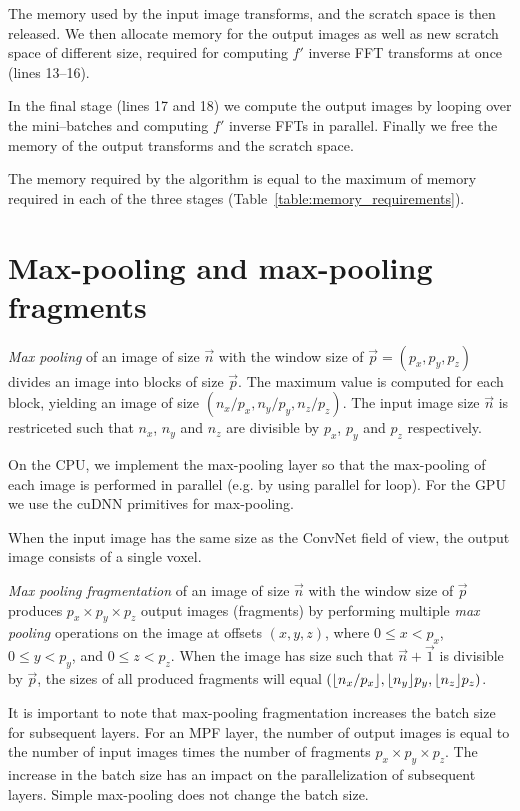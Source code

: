 \documentclass[conference]{./IEEEtran/IEEEtran}
\DeclarePairedDelimiter{\floor}{\lfloor}{\rfloor}
\begin{document}
  The memory used by the input image transforms, and the scratch space
  is then released.  We then allocate memory for the output images as
  well as new scratch space of different size, required for computing
  $f'$ inverse FFT transforms at once (lines 13--16).

  In the final stage (lines 17 and 18) we compute the output images by
  looping over the mini--batches and computing $f'$ inverse FFTs in
  parallel.  Finally we free the memory of the output transforms and
  the scratch space.

  The memory required by the algorithm is equal to the maximum of
  memory required in each of the three stages
  (Table~\ref{table:memory_requirements}).

\section{Max-pooling and max-pooling fragments}

  \emph{Max pooling} of an image of size $\vec{n}$ with the window
  size of $\vec{p} = (p_x,p_y,p_z)$ divides an image into blocks of
  size $\vec{p}$.  The maximum value is computed for each block,
  yielding an image of size $(n_x/p_x,n_y/p_y,n_z/p_z)$.  The input
  image size $\vec{n}$ is restriceted such that $n_x$, $n_y$ and $n_z$
  are divisible by $p_x$, $p_y$ and $p_z$ respectively.

  On the CPU, we implement the max-pooling layer so that the
  max-pooling of each image is performed in parallel (e.g. by using
  parallel for loop).  For the GPU we use the cuDNN primitives for
  max-pooling.

  When the input image has the same size as the ConvNet field of view,
  the output image consists of a single voxel.

  \emph{Max pooling fragmentation} of an image of size $\vec{n}$ with the
  window size of $\vec{p}$ produces $p_x \times p_y \times p_z$ output
  images (fragments) by performing multiple \emph{max pooling}
  operations on the image at offsets $(x,y,z)$, where $0 \le x < p_x$,
  $0 \le y < p_y$, and $0 \le z < p_z$.  When the image has size such
  that $\vec{n} + \vec{1}$ is divisible by $\vec{p}$, the sizes of all
  produced fragments will equal
  $(\floor{n_x/p_x},\floor{n_y}{p_y},\floor{n_z}{p_z})$.

  It is important to note that max-pooling fragmentation increases the
  batch size for subsequent layers.  For an MPF layer, the number of
  output images is equal to the number of input images times the
  number of fragments $p_x \times p_y \times p_z$.  The increase in
  the batch size has an impact on the parallelization of subsequent
  layers.  Simple max-pooling does not change the batch size.
\end{document}
